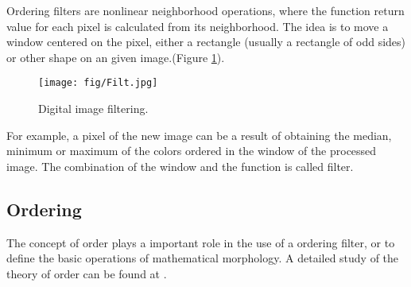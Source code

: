 Ordering filters are nonlinear neighborhood operations, where the function return value for each pixel is calculated from its neighborhood. The idea is to move a window centered on the pixel, either a rectangle (usually a rectangle of odd sides) or other shape on an given image.(Figure \ref{fig:Filt}). 


\begin{figure}[htbp]
	\centering
		\texttt{[image: fig/Filt.jpg]}
	\caption{Digital image filtering.}
	\label{fig:Filt}
\end{figure}



For example, a pixel of the new image can be a result of obtaining the median, minimum or maximum of the colors ordered in the window of the processed image.  
The combination of the window and the function is called filter. 

\subsection{Ordering}
The concept of order plays a important role in the use of a ordering filter, or to define the basic operations of mathematical morphology. A detailed study of the theory of order can be found at \cite {serra1993anamorphoses}.


  

